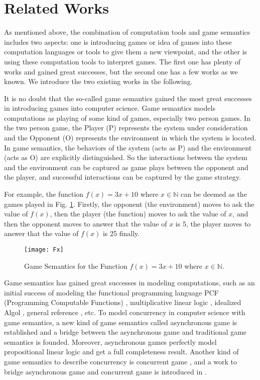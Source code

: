 \documentclass{fac}
\begin{document}
\section{Related Works}\label{RelatedWorks}

As mentioned above, the combination of computation tools and game semantics includes two aspects: one is introducing games or idea of games into these computation languages or tools to give them a new viewpoint, and the other is using these computation tools to interpret games. The first one has plenty of works and gained great successes, but the second one has a few works \cite{GameCTR} \cite{GameProcess} as we known. We introduce the two existing works in the following.

It is no doubt that the so-called game semantics gained the most great successes in introducing games into computer science. Game semantics models computations as playing of some kind of games, especially two person games. In the two person game, the Player (P) represents the system under consideration and the Opponent (O) represents the environment in which the system is located. In game semantics, the behaviors of the system (acts as P) and the environment (acts as O) are explicitly distinguished. So the interactions between the system and the environment can be captured as game plays between the opponent and the player, and successful interactions can be captured by the game strategy.

For example, the function $f(x)=3x+10$ where $x \in \mathds{N}$ can be deemed as the games played in Fig. \ref{F(x)}. Firstly, the opponent (the environment) moves to ask the value of $f(x)$, then the player (the function) moves to ask the value of $x$, and then the opponent moves to answer that the value of $x$ is 5, the player moves to answer that the value of $f(x)$ is 25 finally.

\begin{figure}
  \centering
\texttt{[image: Fx]}
  \caption{Game Semantics for the Function $f(x)=3x+10$ where $x \in \mathds{N}$.}
  \label{F(x)}
\end{figure}

Game semantics has gained great successes in modeling computations, such as an initial success of modeling the functional programming language PCF (Programming Computable Functions) \cite{PCF} \cite{PCF2} \cite{PCF3}, multiplicative linear logic \cite{MIL}, idealized Algol \cite{Algol}, general reference \cite{GR}, etc. To model concurrency in computer science with game semantics, a new kind of game semantics called asynchronous game \cite{AsynGame1} \cite{AsynGame2} \cite{AsynGame3} \cite{AsynGame4} \cite{AsynGame5} is established and a bridge between the asynchronous game and traditional game semantics is founded. Moreover, asynchronous games perfectly model propositional linear logic and get a full completeness result. Another kind of game semantics to describe concurrency is concurrent game \cite{ConGame1} \cite{ConGame2}, and a work to bridge asynchronous game and concurrent game is introduced in \cite{AsynAndConGame}.
\end{document}
